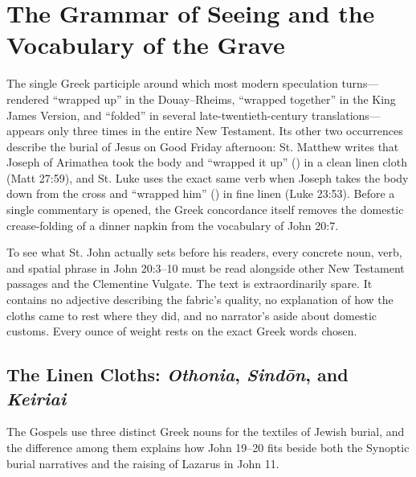 \section{The Grammar of Seeing and the Vocabulary of the Grave}
\label{sec:grammar}

The single Greek participle around which most modern speculation turns---rendered ``wrapped up'' in the Douay--Rheims, ``wrapped together'' in the King James Version, and ``folded'' in several late-twentieth-century translations---appears only three times in the entire New Testament. Its other two occurrences describe the burial of Jesus on Good Friday afternoon: St. Matthew writes that Joseph of Arimathea took the body and ``wrapped it up'' () in a clean linen cloth (Matt 27:59), and St. Luke uses the exact same verb when Joseph takes the body down from the cross and ``wrapped him'' () in fine linen (Luke 23:53). Before a single commentary is opened, the Greek concordance itself removes the domestic crease-folding of a dinner napkin from the vocabulary of John 20:7.

To see what St. John actually sets before his readers, every concrete noun, verb, and spatial phrase in John 20:3--10 must be read alongside other New Testament passages and the Clementine Vulgate. The text is extraordinarily spare. It contains no adjective describing the fabric's quality, no explanation of how the cloths came to rest where they did, and no narrator's aside about domestic customs. Every ounce of weight rests on the exact Greek words chosen.

\subsection{The Linen Cloths: \emph{Othonia}, \emph{Sind\={o}n}, and \emph{Keiriai}}

The Gospels use three distinct Greek nouns for the textiles of Jewish burial, and the difference among them explains how John 19--20 fits beside both the Synoptic burial narratives and the raising of Lazarus in John 11.

